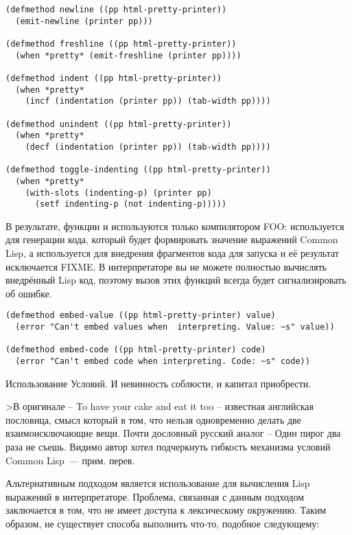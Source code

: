 \begin{lstlisting}
(defmethod newline ((pp html-pretty-printer))
  (emit-newline (printer pp)))

(defmethod freshline ((pp html-pretty-printer))
  (when *pretty* (emit-freshline (printer pp))))

(defmethod indent ((pp html-pretty-printer))
  (when *pretty* 
    (incf (indentation (printer pp)) (tab-width pp))))

(defmethod unindent ((pp html-pretty-printer))
  (when *pretty* 
    (decf (indentation (printer pp)) (tab-width pp))))

(defmethod toggle-indenting ((pp html-pretty-printer))
  (when *pretty* 
    (with-slots (indenting-p) (printer pp)
      (setf indenting-p (not indenting-p)))))
\end{lstlisting}

В результате, функции  и  используются только
компилятором FOO:  используется для генерации кода, который будет
формировать значение выражений Common Lisp, а  используется для внедрения
фрагментов кода для запуска и её результат исключается FIXME. В интерпретаторе вы не
можете полностью вычислять внедрённый Lisp код, поэтому вызов этих функций всегда будет
сигнализировать об ошибке.

\begin{lstlisting}
(defmethod embed-value ((pp html-pretty-printer) value)
  (error "Can't embed values when  interpreting. Value: ~s" value))

(defmethod embed-code ((pp html-pretty-printer) code)
  (error "Can't embed code when interpreting. Code: ~s" code))
\end{lstlisting}


Использование Условий. И невинность соблюсти, и капитал приобрести.

>В оригинале – To have your cake and eat it too – известная английская пословица, смысл
который в том, что нельзя одновременно делать две взаимоисключающие вещи. Почти дословный
русский аналог – Один пирог два раза не съешь. Видимо автор хотел подчеркнуть гибкость
механизма условий Common Lisp~--- прим. перев.

Альтернативным подходом является использование  для вычисления Lisp выражений в
интерпретаторе. Проблема, связанная с данным подходом заключается в том, что 
не имеет доступа к лексическому окружению. Таким образом, не существует способа выполнить
что-то, подобное следующему:

